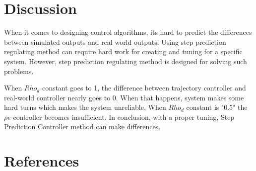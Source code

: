 \documentclass[9pt]{article}
\begin{document}
\section{Discussion}

When it comes to designing control algorithms, its hard to predict the differences between simulated outputs and real world outputs. Using step prediction regulating method can require hard work for creating and tuning for a specific system. However, step prediction regulating method is designed for solving such problems.

When $Rho_d$ constant goes to 1, the difference between trajectory controller and real-world controller nearly goes to 0. When that happens, system makes some hard turns which makes the system unreliable,
When $Rho_d$ constant is "0.5" the $\rho e$ controller becomes insufficient. In conclusion, with a proper tuning, Step Prediction Controller method can make differences.
\pagebreak

\section{References}
\end{document}
